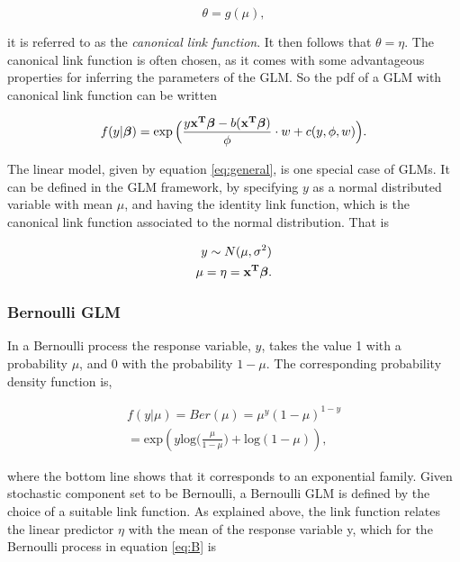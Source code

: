 \begin{equation}
\theta = g(\mu),
\end{equation}

it is referred to as the \textit{canonical link function}. It then follows that $\theta=\eta$. The canonical link function is often chosen, as it comes with some advantageous properties for inferring the parameters of the GLM. So the pdf of a GLM with canonical link function can be written

\begin{equation}
   f(y|\bm{\beta}) =  \exp\Big(\frac{y  {\bf x^T} {\bm{ \beta}} - b( \bf x^T \bm{ \beta})}{\phi} \cdot w + c(y,\phi,w)\Big).
\end{equation}

The linear model, given by equation \ref{eq:general}, is one special case of GLMs. It can be defined in the GLM framework, by specifying $y$ as a normal distributed variable with mean $\mu$, and having the identity link function, which is the canonical link function associated to the normal distribution. That is

\begin{equation}
\begin{split}
y \sim N(\mu, \sigma^2) \\
\mu = \eta = \bf x^T \bm{ \beta}.
\end{split}
\end{equation}

\subsubsection{Bernoulli GLM}
\label{sec:Bernoulli}

In a Bernoulli process the response variable, $y$, takes the value 1 with a probability $\mu$, and 0 with the probability $1-\mu$. The corresponding probability density function is,

\begin{equation}
\begin{split}
\label{eq:B}
    f(y|\mu) = Ber(\mu) = \mu^{y}(1-\mu)^{1-y}\\
    = \text{exp} ( y  \text{log}\big(\frac{\mu}{1-\mu}\big) + \text{log}(1-\mu)),
\end{split}
\end{equation}

where the bottom line shows that it corresponds to an exponential family. Given stochastic component set to be Bernoulli, a Bernoulli GLM is defined by the choice of a suitable link function. As explained above, the link function relates the linear predictor $\eta$ with the mean of the response variable y, which for the Bernoulli process in equation \ref{eq:B} is 

